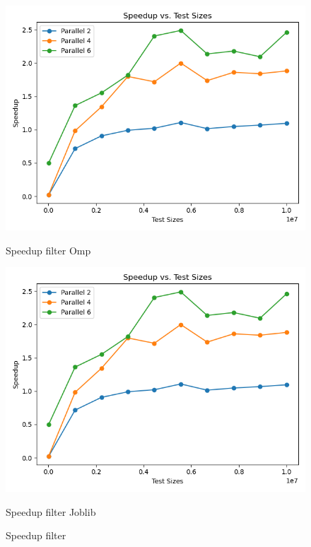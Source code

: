 \documentclass[11pt]{article}
\begin{document}
    \begin{figure}[H]
        \centering
        \includegraphics[width=\linewidth]{plot_filter_speedup}
            \caption{Speedup filter Omp}\label{fig:filter_speedup_omp}
        \endminipage\hfill
        \includegraphics[width=\linewidth]{plot_filter_speedup}
            \caption{Speedup filter Joblib}\label{fig:filter_speedup_joblib}
        \endminipage\hfill
        \caption{Speedup filter}
    \end{figure}
\end{document}
